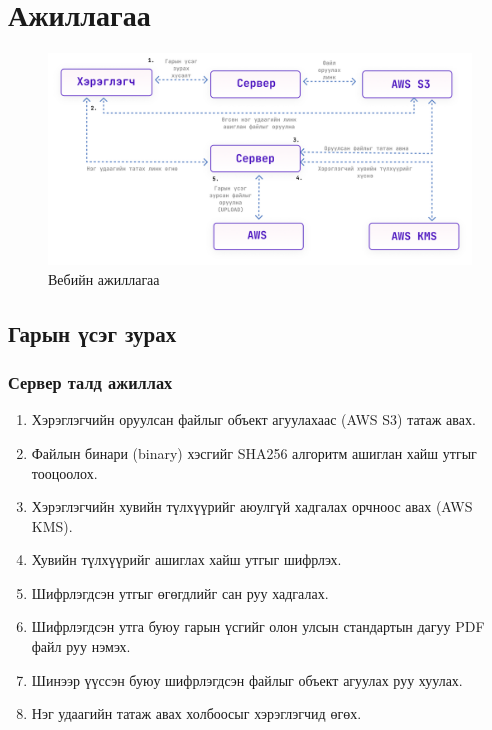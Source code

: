 \section{Ажиллагаа}
\begin{figure}[h!]
	\centering
	\includegraphics[scale=0.4]{assets/serverwork.png}
	\caption{Вебийн ажиллагаа}
	\label{fig:architecture}
\end{figure}
\subsection{Гарын үсэг зурах}
\subsubsection{Сервер талд ажиллах}
\begin{enumerate}
	\item Хэрэглэгчийн оруулсан файлыг объект агуулахаас (AWS S3) татаж авах.
	\item Файлын бинари (binary) хэсгийг SHA256 алгоритм ашиглан хайш утгыг тооцоолох.
	\item Хэрэглэгчийн хувийн түлхүүрийг аюулгүй хадгалах орчноос авах (AWS KMS).
	\item Хувийн түлхүүрийг ашиглах хайш утгыг шифрлэх.
	\item Шифрлэгдсэн утгыг өгөгдлийг сан руу хадгалах.
	\item Шифрлэгдсэн утга буюу гарын үсгийг олон улсын стандартын дагуу PDF файл руу нэмэх.
	\item Шинээр үүссэн буюу шифрлэгдсэн файлыг объект агуулах руу хуулах.
	\item Нэг удаагийн татаж авах холбоосыг хэрэглэгчид өгөх.
\end{enumerate}
